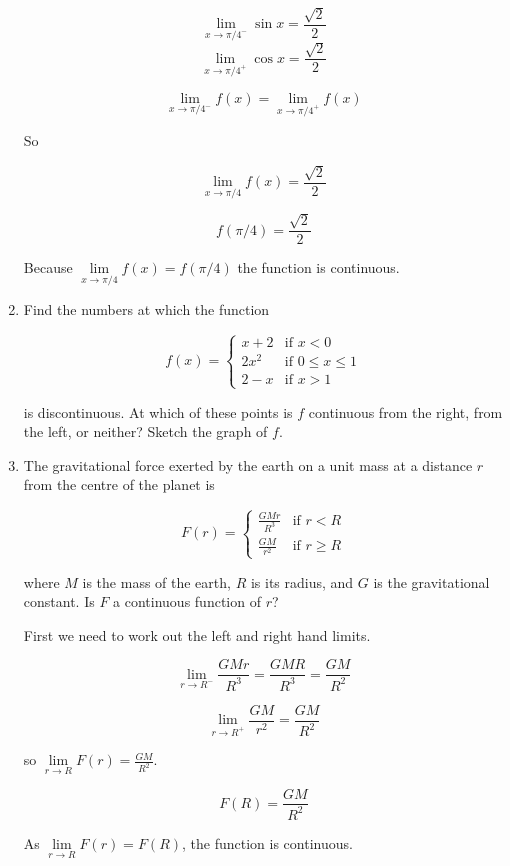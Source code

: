 \documentclass{article}
\begin{document}
\begin{enumerate}
				$$\lim \limits _{x \to \pi/4^{-}} \sin x = \frac{\sqrt{2}}{2}$$
				$$\lim \limits _{x \to \pi/4^{+}} \cos x = \frac{\sqrt{2}}{2}$$


				$$\lim \limits _{x\to \pi/4^{-}} f(x) = \lim \limits _{x \to \pi/4^{+}} f(x)$$

				So

				$$\lim \limits _{x \to \pi/4} f(x) = \frac{\sqrt{2}}{2}$$

				$$f(\pi/4) = \frac{\sqrt{2}}{2}$$

				Because $\lim \limits _{x \to \pi/4} f(x) = f(\pi/4)$ the function is continuous.

			\item Find the numbers at which the function 

				$$f(x) =
					\begin{cases}
						x + 2 & \text{if } x < 0 \\
						2x^2 & \text{if } 0 \leq x \leq 1 \\
						2 - x & \text{if } x > 1
					\end{cases}$$

			is discontinuous. At which of these points is $f$ continuous from the right, from the left,
			or neither? Sketch the graph of $f$.


			\item The gravitational force exerted by the earth on a unit mass at a distance $r$ from the
			centre of the planet is

				$$F(r) = 
					\begin{cases}
						\frac{GMr}{R^3} & \text{if } r < R \\
						\frac{GM}{r^2} & \text{if } r \geq R
					\end{cases}$$	

			where $M$ is the mass of the earth, $R$ is its radius, and $G$ is the gravitational constant.
			Is $F$ a continuous function of $r$?

			First we need to work out the left and right hand limits.

			$$\lim \limits _{r \to R^{-}} \frac{GMr}{R^3} = \frac{GMR}{R^3} = \frac{GM}{R^2}$$

			$$\lim \limits _{r \to R^{+}} \frac{GM}{r^2} = \frac{GM}{R^2}$$

			so $\lim \limits _{r \to R} F(r) = \frac{GM}{R^2}$.

			$$F(R) = \frac{GM}{R^2}$$

			As $\lim \limits _{r \to R} F(r) = F(R)$, the function is continuous.	


\end{enumerate}
\end{document}
